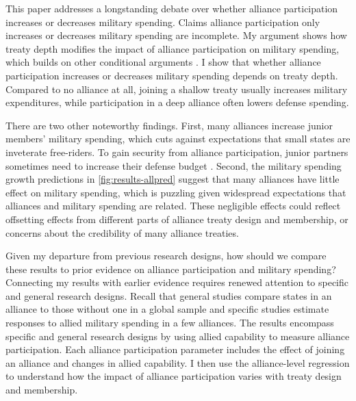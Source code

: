 \documentclass[12pt]{article}
\begin{document}
This paper addresses a longstanding debate over whether alliance participation increases or decreases military spending. 
Claims alliance participation only increases or decreases military spending are incomplete. 
My argument shows how treaty depth modifies the impact of alliance participation on military spending, which builds on other conditional arguments \citep{DigiuseppePoast2016}. 
I show that whether alliance participation increases or decreases military spending depends on treaty depth. 
Compared to no alliance at all, joining a shallow treaty usually increases military expenditures, while participation in a deep alliance often lowers defense spending. 


There are two other noteworthy findings.  
First, many alliances increase junior members' military spending, which cuts against expectations that small states are inveterate free-riders. 
To gain security from alliance participation, junior partners sometimes need to increase their defense budget \citep{Horowitzetal2017}. 
Second, the military spending growth predictions in \autoref{fig:results-allpred} suggest that many alliances have little effect on military spending, which is puzzling given widespread expectations that alliances and military spending are related. 
These negligible effects could reflect offsetting effects from different parts of alliance treaty design and membership, or concerns about the credibility of many alliance treaties. 


Given my departure from previous research designs, how should we compare these results to prior evidence on alliance participation and military spending? 
Connecting my results with earlier evidence requires renewed attention to specific and general research designs. 
Recall that general studies compare states in an alliance to those without one in a global sample and specific studies estimate responses to allied military spending in a few alliances. 
The results encompass specific and general research designs by using allied capability to measure alliance participation. 
Each alliance participation parameter includes the effect of joining an alliance and changes in allied capability. 
I then use the alliance-level regression to understand how the impact of alliance participation varies with treaty design and membership.   
\end{document}
